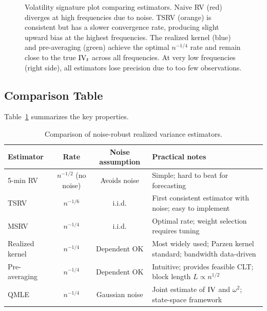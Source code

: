 \begin{figure}[htbp]
\caption{Volatility signature plot comparing estimators.
Naive RV (red) diverges at high frequencies due to noise.
TSRV (orange) is consistent but has a slower convergence rate, producing slight upward bias at the highest frequencies.
The realized kernel (blue) and pre-averaging (green) achieve the optimal $n^{-1/4}$ rate and remain close to the true $\operatorname{IV}_t$ across all frequencies.
At very low frequencies (right side), all estimators lose precision due to too few observations.}
\label{fig:estimator-sig-comparison}
\end{figure}

\subsection{Comparison Table}

Table~\ref{tab:estimator-comparison} summarizes the key properties.

\begin{table}[htbp]
\centering
\caption{Comparison of noise-robust realized variance estimators.}
\label{tab:estimator-comparison}
\begin{tabular}{@{} l c c p{4.5cm} @{}}
\toprule
\textbf{Estimator} & \textbf{Rate} & \textbf{Noise assumption} & \textbf{Practical notes} \\
\midrule
5-min RV & $n^{-1/2}$ (no noise) & Avoids noise & Simple; hard to beat for forecasting \citep{LPS2015} \\[4pt]
TSRV & $n^{-1/6}$ & i.i.d. & First consistent estimator with noise; easy to implement \\[4pt]
MSRV & $n^{-1/4}$ & i.i.d. & Optimal rate; weight selection requires tuning \\[4pt]
Realized kernel & $n^{-1/4}$ & Dependent OK & Most widely used; Parzen kernel standard; bandwidth data-driven \\[4pt]
Pre-averaging & $n^{-1/4}$ & Dependent OK & Intuitive; provides feasible CLT; block length $L \propto n^{1/2}$ \\[4pt]
QMLE & $n^{-1/4}$ & Gaussian noise & Joint estimate of $\operatorname{IV}$ and $\omega^2$; state-space framework \\
\bottomrule
\end{tabular}
\end{table}

